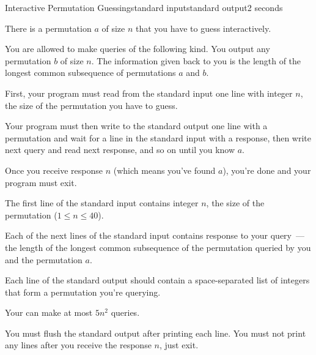 \begin{problem}{Interactive Permutation Guessing}{standard input}{standard output}{2 seconds}


There is a permutation $a$ of size $n$ that you have to guess interactively.

You are allowed to make queries of the following kind. You output any permutation $b$ of size $n$.
The information given back to you is the length of the longest common subsequence of
permutations $a$ and $b$.

\Interaction

First, your program must read from the standard input one line with integer $n$,
the size of the permutation you have to guess.

Your program must then write to the standard output one line with a permutation
and wait for a line in the standard input with a response, then write next query and read next
response, and so on until you know $a$.

Once you receive response $n$ (which means you've found $a$), you're done and
your program must exit.

\InputFile

The first line of the standard input contains integer $n$, the size of the permutation
($1 \le n \le 40$).

Each of the next lines of the standard input contains response to your query~--- the length
of the longest common subsequence of the permutation queried by you and the permutation $a$.

\OutputFile

Each line of the standard output should contain a space-separated list of integers
that form a permutation you're querying.

Your can make at most $5n^2$ queries.

You must flush the standard output after printing each line. You must not print any lines
after you receive the response $n$, just exit.

\Example

\begin{example}
%
\end{example}

\end{problem}
